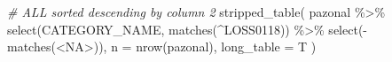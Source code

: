 \documentclass[10pt,landscape,a3paper]{article}
\newenvironment{Shaded}{\begin{snugshade}}{\end{snugshade}}
\newcommand{\AttributeTok}[1]{\textcolor[rgb]{0.77,0.63,0.00}{#1}}
\newcommand{\CommentTok}[1]{\textcolor[rgb]{0.56,0.35,0.01}{\textit{#1}}}
\newcommand{\FunctionTok}[1]{\textcolor[rgb]{0.00,0.00,0.00}{#1}}
\newcommand{\NormalTok}[1]{#1}
\newcommand{\SpecialCharTok}[1]{\textcolor[rgb]{0.00,0.00,0.00}{#1}}
\newcommand{\StringTok}[1]{\textcolor[rgb]{0.31,0.60,0.02}{#1}}
\begin{document}
\begin{Shaded}
\begin{Highlighting}[]
\CommentTok{\# ALL sorted descending by column 2}
\FunctionTok{stripped\_table}\NormalTok{(}
\NormalTok{  pazonal }\SpecialCharTok{\%\textgreater{}\%} \FunctionTok{select}\NormalTok{(CATEGORY\_NAME, }\FunctionTok{matches}\NormalTok{(}\StringTok{\textquotesingle{}\^{}LOSS0118\textquotesingle{}}\NormalTok{)) }\SpecialCharTok{\%\textgreater{}\%} \FunctionTok{select}\NormalTok{(}\SpecialCharTok{{-}}\FunctionTok{matches}\NormalTok{(}\StringTok{\textquotesingle{}\textless{}NA\textgreater{}\textquotesingle{}}\NormalTok{)),}
  \AttributeTok{n =} \FunctionTok{nrow}\NormalTok{(pazonal),}
  \AttributeTok{long\_table =}\NormalTok{ T}
\NormalTok{)}
\end{Highlighting}
\end{Shaded}
\end{document}
